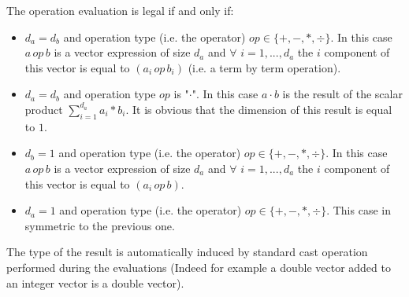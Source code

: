 \documentclass[11pt]{amsart}
\begin{document}
The operation evaluation is legal if and only if:
\begin{itemize}
\item $d_a=d_b$ and operation type (i.e. the operator) $op \in \{ + , - , \ast , \div \}$. In this case $a \, op \, b$ is a vector expression of size $d_a$ and $\forall$ $i=1,...,d_a$ the $i$ component of this vector is equal to
$(a_i \, op \,b_i)$ (i.e. a term by term operation).
\item $d_a = d_b$ and operation type $op$ is "$\cdot$". In this case $a \cdot b$ is the result of the scalar product $\sum_{i =1}^{d_a} a_i \ast b_i$. It is obvious that the dimension of this result is equal to $1$.
\item $d_b=1$ and operation type (i.e. the operator) $op \in \{ + , - , \ast , \div \}$. In this case $a \, op \, b$ is a vector expression of size $d_a$ and $\forall$ $i=1,...,d_a$ the $i$ component of this vector is equal to
$(a_i \, op \,b)$.
\item $d_a=1$ and operation type (i.e. the operator) $op \in \{ + , - , \ast , \div \}$. This case in symmetric to the previous one.
\end{itemize}

The type of the result is automatically induced by standard cast operation performed during the evaluations (Indeed for example a double vector added to an integer vector is a double vector).  
\end{document}
